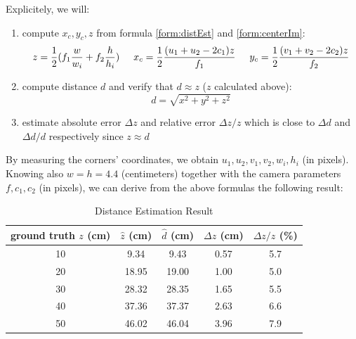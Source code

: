 Explicitely, we will:
\begin{enumerate}
	\item compute $x_c, y_c, z$ from formula \ref{form:distEst} and \ref{form:centerIm}:
	\begin{align*}
	z = \frac{1}{2} (f_1 \frac{w}{w_i} + f_2 \frac{h}{h_i}) \hspace{0.5cm}
	x_c = \frac{1}{2}\frac{(u_1 + u_2 - 2  c_1)z}{f_1} \hspace{0.5cm} y_c = \frac{1}{2}\frac{(v_1 + v_2 - 2c_2)z}{f_2}
	\end{align*}
	\item compute distance $d$ and verify that $d \approx z$ ($z$ calculated above):
	$$d = \sqrt{x^2 + y^2 + z^2}$$
	\item estimate absolute error $\Delta z$ and relative error $\Delta z / z$ which is close to $\Delta d$ and $\Delta d / d$ respectively since $z \approx d$
\end{enumerate} 

By measuring the corners' coordinates, we obtain $u_1, u_2, v_1, v_2, w_i, h_i$ (in pixels). Knowing also $w = h = 4.4$ (centimeters) together with the camera parameters $f, c_1, c_2$ (in pixels), we can derive from the above formulas the following result:

\begin{table}[h!]
	\centering
	\begin{tabular}{c|c|c|c|c}
ground truth $z$ (cm) & $\hat{z}$ (cm) & $\hat{d}$ (cm) & $\Delta z$ (cm) & $\Delta z / z$ (\%)\\
\hline
\hline
10 & 9.34 & 9.43 & 0.57 & 5.7 \\
\hline
20 & 18.95 & 19.00 & 1.00 & 5.0 \\
\hline
30 & 28.32 & 28.35 & 1.65 & 5.5 \\
\hline
40 & 37.36 & 37.37 & 2.63 & 6.6  \\
\hline
50 & 46.02 & 46.04 & 3.96 & 7.9
	\end{tabular}
	\caption{Distance Estimation Result}
	\label{table:2}
\end{table}

